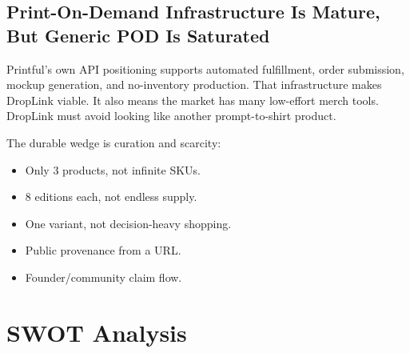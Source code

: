 \documentclass[11pt]{article}
\begin{document}
\subsection{Print-On-Demand Infrastructure Is Mature, But Generic POD Is Saturated}

Printful's own API positioning supports automated fulfillment, order submission, mockup generation, and no-inventory production. That infrastructure makes DropLink viable. It also means the market has many low-effort merch tools. DropLink must avoid looking like another prompt-to-shirt product.

The durable wedge is curation and scarcity:

\begin{itemize}
  \item Only 3 products, not infinite SKUs.
  \item 8 editions each, not endless supply.
  \item One variant, not decision-heavy shopping.
  \item Public provenance from a URL.
  \item Founder/community claim flow.
\end{itemize}

\section{SWOT Analysis}
\end{document}
